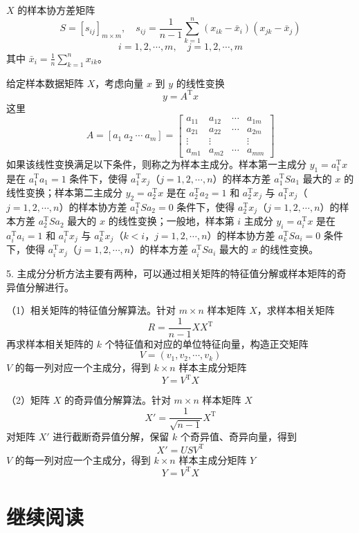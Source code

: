 \documentclass[UTF8,12pt,a4paper,fontset=fandol]{ctexart}
\begin{document}
$X$ 的样本协方差矩阵
\[
S=[s_{ij}]_{m\times m},\quad
s_{ij}=\frac{1}{n-1}\sum_{k=1}^n(x_{ik}-\bar x_i)(x_{jk}-\bar x_j)
\]
\[
i=1,2,\cdots,m,\quad j=1,2,\cdots,m
\]
其中 $\bar x_i=\frac{1}{n}\sum_{k=1}^n x_{ik}$。

给定样本数据矩阵 $X$，考虑向量 $x$ 到 $y$ 的线性变换
\[
y=A^{\mathrm{T}}x
\]
这里
\[
A=[a_1\ a_2\ \cdots\ a_m]=
\begin{bmatrix}
a_{11} & a_{12} & \cdots & a_{1m}\\
a_{21} & a_{22} & \cdots & a_{2m}\\
\vdots & \vdots & & \vdots\\
a_{m1} & a_{m2} & \cdots & a_{mm}
\end{bmatrix}
\]
如果该线性变换满足以下条件，则称之为样本主成分。样本第一主成分 $y_1=a_1^{\mathrm{T}}x$ 是在 $a_1^{\mathrm{T}}a_1=1$ 条件下，使得 $a_1^{\mathrm{T}}x_j$（$j=1,2,\cdots,n$）的样本方差 $a_1^{\mathrm{T}}Sa_1$ 最大的 $x$ 的线性变换；样本第二主成分 $y_2=a_2^{\mathrm{T}}x$ 是在 $a_2^{\mathrm{T}}a_2=1$ 和 $a_2^{\mathrm{T}}x_j$ 与 $a_1^{\mathrm{T}}x_j$（$j=1,2,\cdots,n$）的样本协方差 $a_1^{\mathrm{T}}Sa_2=0$ 条件下，使得 $a_2^{\mathrm{T}}x_j$（$j=1,2,\cdots,n$）的样本方差 $a_2^{\mathrm{T}}Sa_2$ 最大的 $x$ 的线性变换；一般地，样本第 $i$ 主成分 $y_i=a_i^{\mathrm{T}}x$ 是在 $a_i^{\mathrm{T}}a_i=1$ 和 $a_i^{\mathrm{T}}x_j$ 与 $a_k^{\mathrm{T}}x_j$（$k<i$，$j=1,2,\cdots,n$）的样本协方差 $a_k^{\mathrm{T}}Sa_i=0$ 条件下，使得 $a_i^{\mathrm{T}}x_j$（$j=1,2,\cdots,n$）的样本方差 $a_i^{\mathrm{T}}Sa_i$ 最大的 $x$ 的线性变换。

5. 主成分分析方法主要有两种，可以通过相关矩阵的特征值分解或样本矩阵的奇异值分解进行。

（1）相关矩阵的特征值分解算法。针对 $m\times n$ 样本矩阵 $X$，求样本相关矩阵
\[
R=\frac{1}{n-1}XX^{\mathrm{T}}
\]
再求样本相关矩阵的 $k$ 个特征值和对应的单位特征向量，构造正交矩阵
\[
V=(v_1,v_2,\cdots,v_k)
\]
$V$ 的每一列对应一个主成分，得到 $k\times n$ 样本主成分矩阵
\[
Y=V^{\mathrm{T}}X
\]

（2）矩阵 $X$ 的奇异值分解算法。针对 $m\times n$ 样本矩阵 $X$
\[
X'=\frac{1}{\sqrt{n-1}}X^{\mathrm{T}}
\]
对矩阵 $X'$ 进行截断奇异值分解，保留 $k$ 个奇异值、奇异向量，得到
\[
X'=USV^{\mathrm{T}}
\]
$V$ 的每一列对应一个主成分，得到 $k\times n$ 样本主成分矩阵 $Y$
\[
Y=V^{\mathrm{T}}X
\]

\section*{继续阅读}
\end{document}
